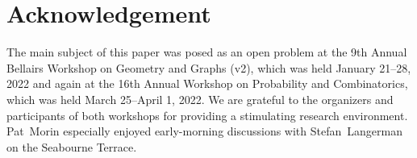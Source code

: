 \documentclass{patmorin}
\DeclareMathOperator{\chicen}{\chi_{\mathrm{cen}}}
\DeclareMathOperator{\chilin}{\chi_{\mathrm{lin}}}
\begin{document}
%
%
%
%
%
%
%
%
%
%
%
%
%
%
%

\section*{Acknowledgement}

The main subject of this paper was posed as an open problem at the 9th Annual Bellairs Workshop on Geometry and Graphs (v2), which was held January 21--28, 2022 and again at the 16th Annual Workshop on Probability and Combinatorics, which was held March 25--April 1, 2022. We are grateful to the organizers and participants of both workshops for providing a stimulating research environment. Pat~Morin especially enjoyed early-morning discussions with Stefan~Langerman on the Seabourne Terrace.




\end{document}
